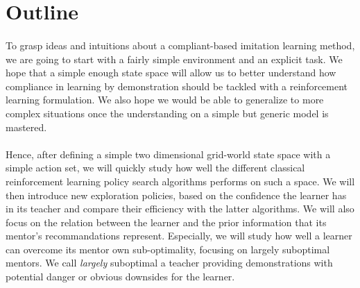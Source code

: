 \documentclass[a4paper]{report}
\begin{document}
{{		}
		\section{Outline}
		{
			
			\paragraph{} To grasp ideas and intuitions about a compliant-based imitation learning method, we are going to start with a fairly simple environment and an explicit task. We hope that a simple enough state space will allow us to better understand how compliance in learning by demonstration should be tackled with a reinforcement learning formulation.  We also hope we would be able to generalize to more complex situations once the understanding on a simple but generic model is mastered. 
			
			\paragraph{} Hence, after defining a simple two dimensional grid-world state space with a simple action set, we will quickly study how well the different classical reinforcement learning policy search algorithms performs on such a space. We will then introduce new exploration policies, based on the confidence the learner has in its teacher and compare their efficiency with the latter algorithms. We will also focus on the relation between the learner and the prior information that its mentor's recommandations represent. Especially, we will study how well a learner can overcome its mentor own sub-optimality, focusing on largely suboptimal mentors. We call \emph{largely} suboptimal a teacher providing demonstrations with potential danger or obvious downsides for the learner. 
		}
	}
	\newpage
	
\end{document}
